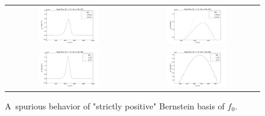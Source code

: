 \documentclass[preprint,12pt]{elsarticle}
\newcommand{\fzero}{f_0}
\begin{document}
\begin{figure}[tbh]
  \begin{center}
    \begin{tabular}{cc}
      \includegraphics[width=0.5\textwidth]{../results/fe_analysis/figs/Bernstein_P5_heatfluxes_Z1_Kn1e-2.png} &
      \includegraphics[width=0.5\textwidth]{../results/fe_analysis/figs/Bernstein_detail_P5_heatfluxes_Z1_Kn1e-2.png} \\
       \includegraphics[width=0.5\textwidth]{../results/fe_analysis/figs/Bernstein_P5_heatfluxes_Z1_Kn1e-8.png} &
      \includegraphics[width=0.5\textwidth]{../results/fe_analysis/figs/Bernstein_detail_P5_heatfluxes_Z1_Kn1e-8.png} 
    \end{tabular}
  \caption{
  A~spurious behavior of "strictly positive" Bernstein basis of $\fzero$.
  }
  \end{center}
  \label{fig:EfieldAWBS}
\end{figure}
\end{document}
